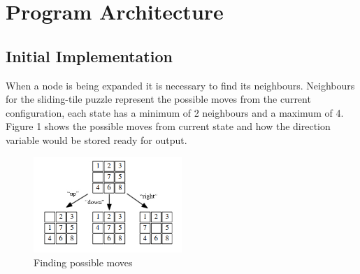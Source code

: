 \documentclass[final]{cmpreport}
\begin{document}
\section{Program Architecture}

\subsection{Initial Implementation}

When a node is being expanded it is necessary to find its neighbours. Neighbours for the sliding-tile puzzle represent the possible moves from the current configuration, each state has a minimum of 2 neighbours and a maximum of 4. Figure 1 shows the possible moves from current state and how the direction variable would be stored ready for output. 

\begin{figure}[ht]
	\centering
	\includegraphics[width=0.5\textwidth]{moves}
	\captionsetup{justification=centering}
	\caption{Finding possible moves}
\end{figure}



\clearpage



\appendix
\clearpage
\end{document}
